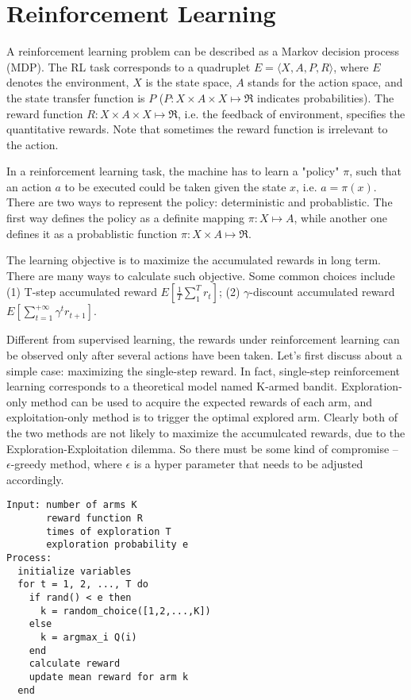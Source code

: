 \section{Reinforcement Learning}

A reinforcement learning problem can be described as a Markov decision process
(MDP). The RL task corresponds to a quadruplet $E=\langle X,A,P,R\rangle$,
where $E$ denotes the environment, $X$ is the state space, $A$ stands for the
action space, and the state transfer function is $P$ ($P:X\times A\times
X\mapsto \Re$ indicates probabilities). The reward function $R:X\times A\times
X\mapsto \Re$, i.e. the feedback of environment, specifies the quantitative
rewards. Note that sometimes the reward function is irrelevant to the action.

In a reinforcement learning task, the machine has to learn a "policy" $\pi$,
such that an action $a$ to be executed could be taken given the state $x$,
i.e. $a=\pi(x)$. There are two ways to represent the policy: deterministic
and probablistic. The first way defines the policy as a definite mapping
$\pi:X\mapsto A$, while another one defines it as a probablistic function
$\pi:X\times A\mapsto \Re$.

The learning objective is to maximize the accumulated rewards in long term.
There are many ways to calculate such objective. Some common choices include
(1) T-step accumulated reward $E[\frac{1}{T}\sum_1^T r_t]$; (2) $\gamma$-discount
accumulated reward $E[\sum_{t=1}^{+\infty} \gamma^t r_{t+1}]$.

Different from supervised learning, the rewards under reinforcement learning
can be observed only after several actions have been taken. Let's first discuss
about a simple case: maximizing the single-step reward. In fact, single-step
reinforcement learning corresponds to a theoretical model named K-armed bandit.
Exploration-only method can be used to acquire the expected rewards of each
arm, and exploitation-only method is to trigger the optimal explored arm.
Clearly both of the two methods are not likely to maximize the accumulcated
rewards, due to the Exploration-Exploitation dilemma. So there must be some
kind of compromise -- $\epsilon$-greedy method, where $\epsilon$ is a hyper
parameter that needs to be adjusted accordingly.

\begin{lstlisting}
Input: number of arms K
       reward function R
	   times of exploration T
	   exploration probability e
Process:
  initialize variables
  for t = 1, 2, ..., T do
    if rand() < e then
	  k = random_choice([1,2,...,K])
	else
	  k = argmax_i Q(i)
	end
	calculate reward
	update mean reward for arm k
  end
\end{lstlisting}

